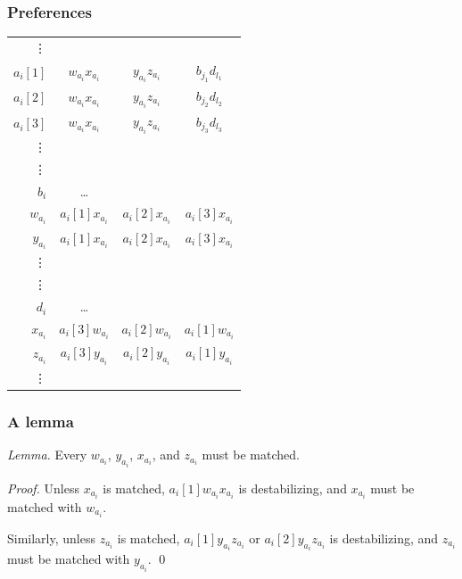 \documentclass[mathserif,serif]{beamer}
\begin{document}
\begin{frame}
	\frametitle{Preferences}

	\begin{tabular}{r | c c c}
		\vdots \\
		$a_i[1]$ &	$w_{a_i}x_{a_i}$ &	$y_{a_i}z_{a_i}$ &	$b_{j_1}d_{l_1}$ \\
		$a_i[2]$ &	$w_{a_i}x_{a_i}$ &	$y_{a_i}z_{a_i}$ &	$b_{j_2}d_{l_2}$ \\
		$a_i[3]$ &	$w_{a_i}x_{a_i}$ &	$y_{a_i}z_{a_i}$ &	$b_{j_3}d_{l_3}$ \\
		\vdots \\
		\hline
		\vdots \\
		$b_i$ &		\dots \\
		$w_{a_i}$ &	$a_i[1]x_{a_i}$ &	$a_i[2]x_{a_i}$ &	$a_i[3]x_{a_i}$ \\
		$y_{a_i}$ &	$a_i[1]x_{a_i}$ &	$a_i[2]x_{a_i}$ &	$a_i[3]x_{a_i}$ \\
		\vdots \\
		\hline
		\vdots \\
		$d_i$ &		\dots \\
		$x_{a_i}$ &	$a_i[3]w_{a_i}$ &	$a_i[2]w_{a_i}$ &	$a_i[1]w_{a_i}$ \\
		$z_{a_i}$ &	$a_i[3]y_{a_i}$ &	$a_i[2]y_{a_i}$ &	$a_i[1]y_{a_i}$ \\
		\vdots \\
	\end{tabular}
\end{frame}

\begin{frame}
	\frametitle{A lemma}

	\emph{Lemma.}
	Every $w_{a_i}$, $y_{a_i}$, $x_{a_i}$, and $z_{a_i}$ must be matched.

	\emph{Proof.}
	Unless $x_{a_i}$ is matched, $a_i[1]w_{a_i}x_{a_i}$ is destabilizing, and $x_{a_i}$ must be matched with
	$w_{a_i}$.

	Similarly, unless $z_{a_i}$ is matched, $a_i[1]y_{a_i}z_{a_i}$ or $a_i[2]y_{a_i}z_{a_i}$ is destabilizing, and
	$z_{a_i}$ must be matched with $y_{a_i}$.
	\qed
\end{frame}

%
%
%
\end{document}
